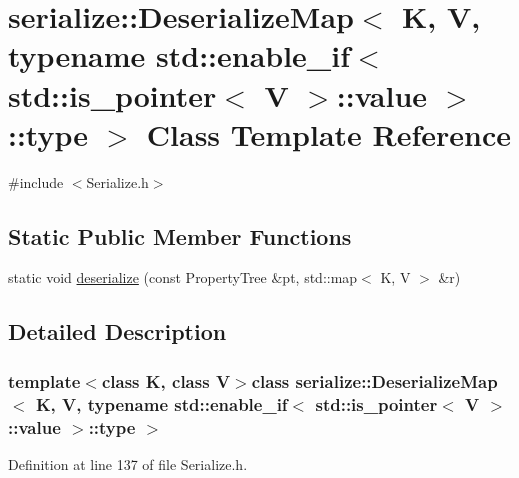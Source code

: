 \hypertarget{classserialize_1_1_deserialize_map_3_01_k_00_01_v_00_01typename_01std_1_1enable__if_3_01std_1_1ibe6cfa8a2d341f3a0942baedd95196d5}{}\section{serialize\+:\+:Deserialize\+Map$<$ K, V, typename std\+:\+:enable\+\_\+if$<$ std\+:\+:is\+\_\+pointer$<$ V $>$\+:\+:value $>$\+:\+:type $>$ Class Template Reference}
\label{classserialize_1_1_deserialize_map_3_01_k_00_01_v_00_01typename_01std_1_1enable__if_3_01std_1_1ibe6cfa8a2d341f3a0942baedd95196d5}


{\ttfamily \#include $<$Serialize.\+h$>$}

\subsection*{Static Public Member Functions}
\begin{DoxyCompactItemize}
\item 
static void \hyperlink{classserialize_1_1_deserialize_map_3_01_k_00_01_v_00_01typename_01std_1_1enable__if_3_01std_1_1ibe6cfa8a2d341f3a0942baedd95196d5_ad440b5c02ce0eb7839f46df2e95f93ee}{deserialize} (const Property\+Tree \&pt, std\+::map$<$ K, V $>$ \&r)
\end{DoxyCompactItemize}


\subsection{Detailed Description}
\subsubsection*{template$<$class K, class V$>$class serialize\+::\+Deserialize\+Map$<$ K, V, typename std\+::enable\+\_\+if$<$ std\+::is\+\_\+pointer$<$ V $>$\+::value $>$\+::type $>$}



Definition at line 137 of file Serialize.\+h.



